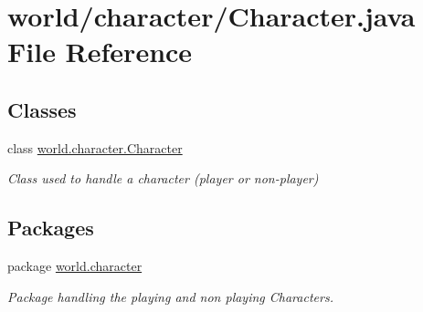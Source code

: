 \hypertarget{a00058}{\section{world/character/\-Character.java File Reference}
\label{a00058}
}
\subsection*{Classes}
\begin{DoxyCompactItemize}
\item 
class \hyperlink{a00005}{world.\-character.\-Character}
\begin{DoxyCompactList}\small\item\em Class used to handle a character (player or non-\/player) \end{DoxyCompactList}\end{DoxyCompactItemize}
\subsection*{Packages}
\begin{DoxyCompactItemize}
\item 
package \hyperlink{a00090}{world.\-character}
\begin{DoxyCompactList}\small\item\em Package handling the playing and non playing Characters. \end{DoxyCompactList}\end{DoxyCompactItemize}
